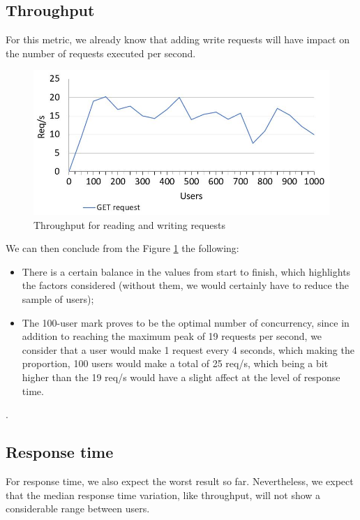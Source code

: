   \subsection{Throughput}
  
  For this metric, we already know that adding write requests will have impact on the number of requests executed per second.
  
  \begin{figure}[H]
    \centering
    \includegraphics[width=.8\textwidth]{img/performance_evaluation/real.JPG}
    \caption{\label{tab:throughput_real}Throughput for reading and writing requests}
  \end{figure}
  
  We can then conclude from the Figure \ref{tab:throughput_real} the following: 
  
  \begin{itemize}
      \item There is a certain balance in the values from start to finish, which highlights the factors considered (without them, we would certainly have to reduce the sample of users);
      \item The 100-user mark proves to be the optimal number of concurrency, since in addition to reaching the maximum peak of 19 requests per second, we consider that a user would make 1 request every 4 seconds, which making the proportion, 100 users would make a total of 25 req/s, which being a bit higher than the 19 req/s would have a slight affect at the level of response time.
  \end{itemize}. 
  
  
  \subsection{Response time}
  
  For response time, we also expect the worst result so far. Nevertheless, we expect that the median response time variation, like throughput, will not show a considerable range between users.
  
